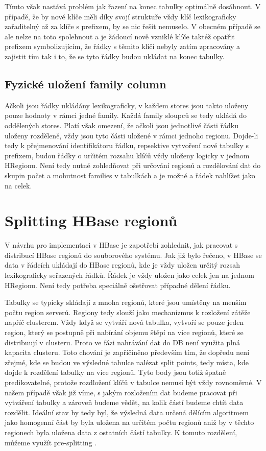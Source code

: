 \documentclass[thesis=M,czech]{FITthesis}[2012/06/26]
\begin{document}
Tímto však nastává problém jak řazení na konec tabulky optimálně dosáhnout. V případě, že by nové klíče měli díky svojí struktuře vždy klíč lexikograficky zařaditelný až za klíče s prefixem, by se nic řešit nemuselo. V obecném případě se ale nelze na toto spolehnout a je žádoucí nově vzniklé klíče taktéž opatřit prefixem symbolizujícím, že řádky s těmito klíči nebyly zatím zpracovány a zajistit tím tak i to, že se tyto řádky budou ukládat na konec tabulky. 

\subsection{Fyzické uložení family column}
Ačkoli jsou řádky ukládány lexikograficky, v každem stores jsou takto uloženy pouze hodnoty v rámci jedné family. Každá family sloupců se tedy ukládá do oddělených stores. Platí však omezení, že ačkoli jsou jednotlivé části řádku uloženy rozděleně, vždy jsou tyto části uložené v rámci jednoho regionu. Dojde-li tedy k přejmenování identifikátoru řádku, repsektive vytvoření nové tabulky s prefixem, budou řádky o určitém rozsahu klíčů vždy uloženy logicky v jednom HRegionu. Není tedy nutné zohledňovat při určování regionů a rozdělování dat do skupin počet a mohutnost families v tabulkách a je možné a řádek nahlížet jako na celek.


\section{Splitting HBase regionů}
V návrhu pro implementaci v HBase je zapotřebí zohlednit, jak pracovat s distribucí HBase regionů do souborového systému. Jak již bylo řečeno, v HBase se data v řádcích ukládají do HBase regionů, kde je vždy uložen určitý rozsah lexikograficky seřazených řádků. Řádek je vždy uložen jako celek jen na jednom HRegionu. Není tedy potřeba speciálně ošetřovat případné dělení řádku. 

Tabulky se typicky skládají z mnoha regionů, které jsou umístěny na menším počtu region serverů. Regiony tedy slouží jako mechanizmus k rozložení zátěže napříč clusterem. Vždy když se vytváří nová tabulka, vytvoří se pouze jeden region, který se postupně při nabírání objemu štěpí na více regionů, které se distribuují v clusteru. Proto ve fázi nahrávání dat do DB není využita plná kapacita clusteru. Toto chování je zapříčiněno především tím, že dopředu není zřejmé, kde se budou ve výsledné tabulce nalézat split points, tedy místa, kde dojde k rozdělení tabulky na více regionů. Tyto body jsou totiž špatně predikovatelné, protože rozdložení klíčů v tabulce nemusí být vždy rovnoměrné. V našem případě však již víme, s jakým rozložením dat budeme pracovat při vytváření tabulky a zároveň budeme vědět, na kolik částí budeme chtít data rozdělit. Ideální stav by tedy byl, že výsledná data určená dělícím algoritmem jako homogenní část by byla uložena na určitém počtu regionů aniž by v těchto regionech byla uložena data z ostatních částí tabulky. K tomuto rozdělení, můžeme využít pre-splitting \cite{split}.
\end{document}
